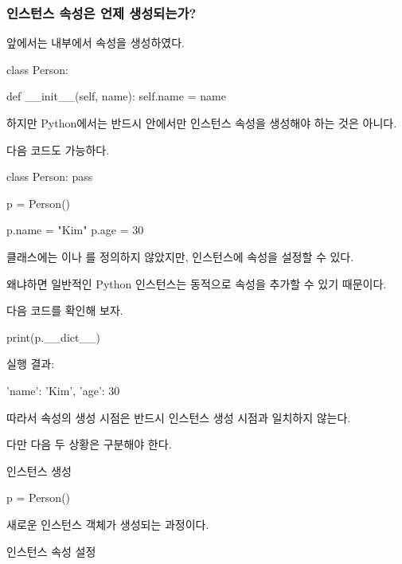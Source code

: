 \subsubsection{인스턴스 속성은 언제 생성되는가?}

앞에서는  내부에서 속성을 생성하였다.

\begin{dhkcode}
class Person:

    def __init__(self, name):
        self.name = name
\end{dhkcode}

하지만 Python에서는 반드시  안에서만 인스턴스 속성을 생성해야 하는 것은 아니다.

다음 코드도 가능하다.

\begin{dhkcode}
class Person:
    pass

p = Person()

p.name = "Kim"
p.age = 30
\end{dhkcode}

 클래스에는 이나 를 정의하지 않았지만, 인스턴스에 속성을 설정할 수 있다.

왜냐하면 일반적인 Python 인스턴스는 동적으로 속성을 추가할 수 있기 때문이다.

다음 코드를 확인해 보자.

\begin{dhkcode}
print(p.__dict__)
\end{dhkcode}

실행 결과:

\begin{dhkzsh}
{'name': 'Kim', 'age': 30}
\end{dhkzsh}

따라서 속성의 생성 시점은 반드시 인스턴스 생성 시점과 일치하지 않는다.

다만 다음 두 상황은 구분해야 한다.

\begin{dhknote}
\begin{dhksmry}[centered]
인스턴스 생성
\end{dhksmry}
\end{dhknote}

\begin{dhkcode}
p = Person()
\end{dhkcode}

새로운 인스턴스 객체가 생성되는 과정이다.

\begin{dhknote}
\begin{dhksmry}[centered]
인스턴스 속성 설정
\end{dhksmry}
\end{dhknote}

